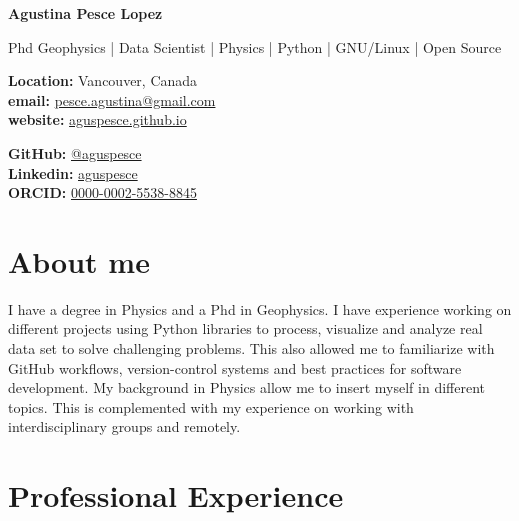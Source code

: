 \documentclass[10pt, a4paper]{article}
\makeatletter
\newcommand{\firstname}{Agustina}
\newcommand{\familyname}{Pesce Lopez}
\newcommand{\email}{pesce.agustina@gmail.com}
\newcommand{\website}{aguspesce.github.io}
\newcommand{\github}{aguspesce}
\newcommand{\linkedin}{aguspesce}
\newcommand{\orcid}{0000-0002-5538-8845}
\newcommand{\fullname}{\firstname{} \familyname}
\newcommand{\maintitle}[1]{
    \begin{center}
        \textbf{\Huge #1}
    \end{center}
}
\newcommand{\subtitle}[1]{
    \begin{center}
        {\large #1}
    \end{center}
}
\newcommand{\affiliation}[1]{
    \begin{center}
        {#1}
    \end{center}
}
\newcommand{\entriespad}{0.75em}
\newcommand{\MAIL}[1]{\href{mailto:#1}{#1}}
\newcommand{\GITHUB}[1]{\href{https://github.com/#1}{@#1}}
\newcommand{\ORCID}[1]{\href{https://orcid.org/#1}{#1}}
\newcommand{\WEBSITE}[1]{\href{https://#1}{#1}}
\newcommand{\LINKEDIN}[1]{\href{https://linkedin.com/in/#1}{#1}}
\makeatother
\begin{document}
\maintitle{\fullname}
\subtitle{Phd Geophysics | Data Scientist | Physics | Python | GNU/Linux | Open
Source}
\vspace{\entriespad}

\begin{minipage}[t]{0.60\linewidth}
    \begin{flushleft}
        \textbf{Location:} Vancouver, Canada
        \\
        \textbf{email:} \MAIL{\email}
        \\
        \textbf{website:} \WEBSITE{\website}
    \end{flushleft}
\end{minipage}
\hfill
\begin{minipage}[t]{0.40\linewidth}
    \begin{flushright}
        \textbf{GitHub:} \GITHUB{\github}
        \\
        \textbf{Linkedin:} \LINKEDIN{\linkedin}
        \\
        \textbf{ORCID:} \ORCID{\orcid}
    \end{flushright}
\end{minipage}

\vspace{\entriespad}


\section{About me}

I have a degree in Physics and a Phd in Geophysics.
I have experience working on different projects using Python libraries to
process, visualize and analyze real data set to solve challenging problems.
This also allowed me to familiarize with GitHub workflows, version-control
systems and best practices for software development.
My background in Physics allow me to insert myself in different topics.
This is complemented with my experience on working with interdisciplinary groups
and remotely.


\section{Professional Experience}
\end{document}
